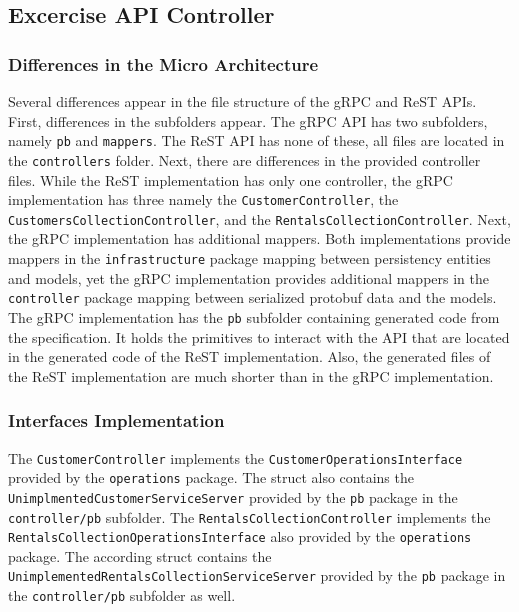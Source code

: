 \subsection{Excercise API Controller}
\subsubsection*{Differences in the Micro Architecture}
Several differences appear in the file structure of the gRPC and ReST APIs.
First, differences in the subfolders appear.
The gRPC API has two subfolders, namely \texttt{pb} and \texttt{mappers}.
The ReST API has none of these, all files are located in the \texttt{controllers} folder.
Next, there are differences in the provided controller files.
While the ReST implementation has only one controller, the gRPC implementation has three namely the \texttt{CustomerController}, the \texttt{CustomersCollectionController}, and the \texttt{RentalsCollectionController}.
Next, the gRPC implementation has additional mappers.
Both implementations provide mappers in the \texttt{infrastructure} package mapping between persistency entities and models, yet the gRPC implementation provides additional mappers in the \texttt{controller} package mapping between serialized protobuf data and the models.
The gRPC implementation has the \texttt{pb} subfolder containing generated code from the specification.
It holds the primitives to interact with the API that are located in the generated code of the ReST implementation.
Also, the generated files of the ReST implementation are much shorter than in the gRPC implementation.

\subsubsection*{Interfaces Implementation}
The \texttt{CustomerController} implements the \texttt{CustomerOperationsInterface} provided by the \texttt{operations} package.
The struct also contains the \texttt{UnimplmentedCustomerServiceServer} provided by the \texttt{pb} package in the \texttt{controller/pb} subfolder.
The \texttt{RentalsCollectionController} implements the \texttt{RentalsCollectionOperationsInterface} also provided by the \texttt{operations} package.
The according struct contains the \texttt{UnimplementedRentalsCollectionServiceServer} provided by the \texttt{pb} package in the \texttt{controller/pb} subfolder as well.

